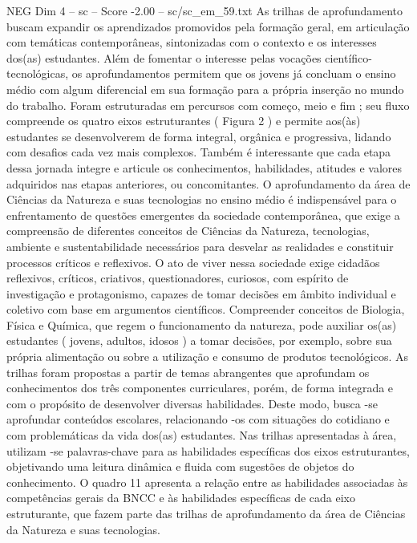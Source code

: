 \begin{textsample}{NEG Dim 4 – sc – Score -2.00 – sc/sc\_em\_59.txt}
As trilhas de aprofundamento buscam expandir os aprendizados promovidos pela formação geral, em articulação com temáticas contemporâneas, sintonizadas com o contexto e os interesses dos(as) estudantes.
Além de fomentar o interesse pelas vocações científico-tecnológicas, os aprofundamentos permitem que os jovens já concluam o ensino médio com algum diferencial em sua formação para a própria inserção no mundo do trabalho.
Foram estruturadas em percursos com começo, meio e fim ; seu fluxo compreende os quatro eixos estruturantes ( Figura 2 ) e permite aos(às) estudantes se desenvolverem de forma integral, orgânica e progressiva, lidando com desafios cada vez mais complexos.
Também é interessante que cada etapa dessa jornada integre e articule os conhecimentos, habilidades, atitudes e valores adquiridos nas etapas anteriores, ou concomitantes.
O aprofundamento da área de Ciências da Natureza e suas tecnologias no ensino médio é indispensável para o enfrentamento de questões emergentes da sociedade contemporânea, que exige a compreensão de diferentes conceitos de Ciências da Natureza, tecnologias, ambiente e sustentabilidade necessários para desvelar as realidades e constituir processos críticos e reflexivos.
O ato de viver nessa sociedade exige cidadãos reflexivos, críticos, criativos, questionadores, curiosos, com espírito de investigação e protagonismo, capazes de tomar decisões em âmbito individual e coletivo com base em argumentos científicos.
Compreender conceitos de Biologia, Física e Química, que regem o funcionamento da natureza, pode auxiliar os(as) estudantes ( jovens, adultos, idosos ) a tomar decisões, por exemplo, sobre sua própria alimentação ou sobre a utilização e consumo de produtos tecnológicos.
As trilhas foram propostas a partir de temas abrangentes que aprofundam os conhecimentos dos três componentes curriculares, porém, de forma integrada e com o propósito de desenvolver diversas habilidades.
Deste modo, busca -se aprofundar conteúdos escolares, relacionando -os com situações do cotidiano e com problemáticas da vida dos(as) estudantes.
Nas trilhas apresentadas à área, utilizam -se palavras-chave para as habilidades específicas dos eixos estruturantes, objetivando uma leitura dinâmica e fluida com sugestões de objetos do conhecimento.
O quadro 11 apresenta a relação entre as habilidades associadas às competências gerais da BNCC e às habilidades específicas de cada eixo estruturante, que fazem parte das trilhas de aprofundamento da área de Ciências da Natureza e suas tecnologias.

\end{textsample}
